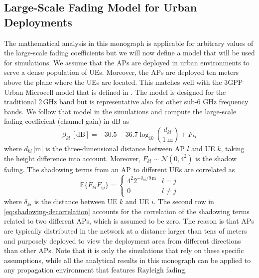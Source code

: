  \subsection{Large-Scale Fading Model for Urban Deployments}
 \label{subsec:large-scale-fading-model}

The mathematical analysis in this monograph is applicable for arbitrary values of the large-scale fading coefficients but we will now define a model that will be used for simulations.
We assume that the APs are deployed in urban environments to serve a dense population of UEs. Moreover, the APs are deployed ten meters above the plane where the UEs are located. This matches well with the 3GPP Urban Microcell model that is defined in \cite[Table~B.1.2.1-1]{LTE2017a}. 
The model is designed for the traditional 2\,GHz band but is representative also for other sub-6 GHz frequency bands.
We follow that model in the simulations and compute the large-scale fading coefficient (channel gain) in dB as 
\begin{equation}\label{eq:pathloss-coefficient}
\beta_{kl} \,  [\textrm{dB}] = -30.5 - 36.7 \log_{10}\left( \frac{d_{kl}}{1\,\textrm{m}} \right)  + F_{kl}
\end{equation}
where $d_{kl}$\,[m] is the three-dimensional distance between \gls{AP} $l$ and \gls{UE} $k$, taking the height difference into account.
Moreover, $F_{kl} \sim \mathcal{N}(0,4^2)$ is the shadow fading. The shadowing terms from an AP to different UEs are correlated as \cite[Table B.1.2.2.1-4]{LTE2017a}
\begin{equation} \label{eq:shadowing-decorrelation}
\mathbb{E} \{ F_{kl} F_{ij} \} = 
\begin{cases}
4^2 2^{-\delta_{ki}/9\,\textrm{m}} & l = j \\
0 & l \neq j
\end{cases}
\end{equation}
where $\delta_{ki}$ is the distance between UE $k$ and UE $i$. The second row in \eqref{eq:shadowing-decorrelation} accounts for the correlation of the shadowing terms related to two different APs, which is assumed to be zero. The reason is that APs are typically distributed in the network at a distance larger than tens of meters and purposely deployed to view the deployment area from different directions than other APs. Note that it is only the simulations that rely on these specific assumptions, while all the analytical results in this monograph can be applied to any propagation environment that features Rayleigh fading.


